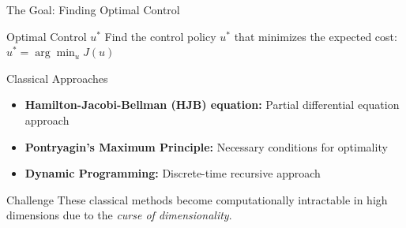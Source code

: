 \documentclass[aspectratio=169,xcolor=dvipsnames]{beamer}
\begin{document}
\begin{frame}{The Goal: Finding Optimal Control}
    \begin{block}{Optimal Control $u^*$}
        Find the control policy $u^*$ that minimizes the expected cost: $u^* = \arg\min_u J(u)$
    \end{block}
    
    \vspace{0.3cm}
    
    \begin{block}{Classical Approaches}
        \begin{itemize}
            \item \textbf{Hamilton-Jacobi-Bellman (HJB) equation:} Partial differential equation approach
            \item \textbf{Pontryagin's Maximum Principle:} Necessary conditions for optimality
            \item \textbf{Dynamic Programming:} Discrete-time recursive approach
        \end{itemize}
    \end{block}
    
    \vspace{0.3cm}
    
    \begin{alertblock}{Challenge}
        These classical methods become computationally intractable in high dimensions due to the \textit{curse of dimensionality}.
    \end{alertblock}
\end{frame}




\end{document}
